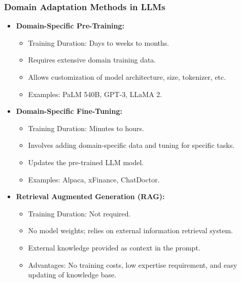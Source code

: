\begin{frame}[fragile]\frametitle{Domain Adaptation Methods in LLMs}
  \begin{itemize}
    \item \textbf{Domain-Specific Pre-Training:}
      \begin{itemize}
        \item Training Duration: Days to weeks to months.
        \item Requires extensive domain training data.
        \item Allows customization of model architecture, size, tokenizer, etc.
        \item Examples: PaLM 540B, GPT-3, LLaMA 2.
      \end{itemize}
    \item \textbf{Domain-Specific Fine-Tuning:}
      \begin{itemize}
        \item Training Duration: Minutes to hours.
        \item Involves adding domain-specific data and tuning for specific tasks.
        \item Updates the pre-trained LLM model.
        \item Examples: Alpaca, xFinance, ChatDoctor.
      \end{itemize}
    \item \textbf{Retrieval Augmented Generation (RAG):}
      \begin{itemize}
        \item Training Duration: Not required.
        \item No model weights; relies on external information retrieval system.
        \item External knowledge provided as context in the prompt.
        \item Advantages: No training costs, low expertise requirement, and easy updating of knowledge base.
      \end{itemize}
  \end{itemize}
\end{frame}


